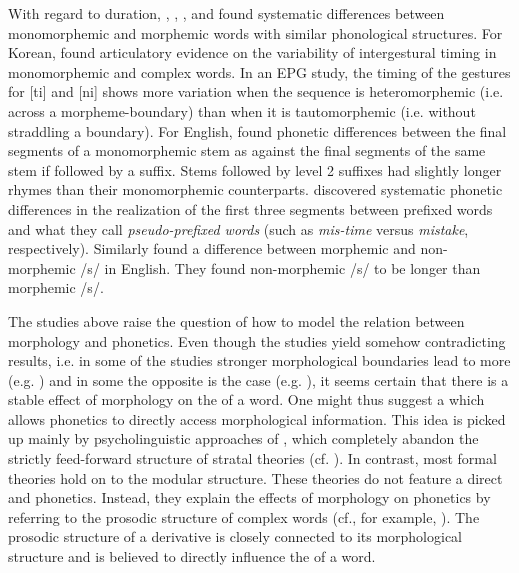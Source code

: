 With regard to duration, \cite{Cho.2001}, \cite{Sugahara.2009}, \cite{Hanique.2011}, \cite{Smith.2012} and \cite{Plag.2017} found systematic differences between monomorphemic and morphemic words with similar phonological structures. For Korean, \cite{Cho.2001} found articulatory evidence on the variability of intergestural timing in monomorphemic and complex words. In an EPG study, the timing of the gestures for [ti] and [ni] shows more variation when the sequence is heteromorphemic (i.e. across a morpheme-boundary) than when it is tautomorphemic (i.e. without straddling a boundary).
For English, \citet{Sugahara.2009} found phonetic differences between the final segments of a monomorphemic stem as against the final segments of the same stem if followed by a suffix. Stems followed by level 2 suffixes had slightly longer rhymes than their monomorphemic counterparts. \citet{Smith.2012} discovered systematic phonetic differences in the realization of the first three segments between prefixed words and what they call \textit{pseudo-prefixed words} (such as \textit{mis-time} versus \textit{mistake}, respectively). Similarly \cite{Plag.2017} found a difference between morphemic and non-morphemic /s/ in English. They found non-morphemic /s/ to be longer than morphemic /s/. 


The studies above raise the question of how to model the relation between morphology and phonetics. Even though the studies yield somehow contradicting results, i.e. in some of the studies stronger morphological boundaries lead to more  (e.g. \citealt{Sugahara.2009, Smith.2012}) and in some the opposite is the case (e.g. \citealt{Schuppler.2012, Plag.2017}), it seems certain that there is a stable effect of morphology on the  of a word. One might thus suggest a  which allows phonetics to directly access morphological information. This idea is picked up mainly by psycholinguistic approaches of , which completely abandon the strictly feed-forward structure of stratal theories (cf. ). 
In contrast, most formal theories hold on to the modular structure. These theories do not feature a direct  and phonetics. Instead, they explain the effects of morphology on phonetics by referring to the prosodic structure of complex words (cf., for example, \citealt{Booij.1983b,Sproat.1993,Nespor.2007,Sugahara.2009,Bergmann.}). The prosodic structure of a derivative is closely connected to its morphological structure and is believed to directly influence the  of a word. 



